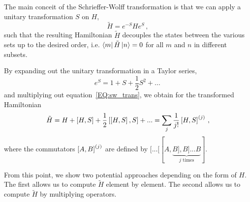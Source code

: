 The main conceit of the Schrieffer-Wolff transformation is that we can apply a unitary transformation $S$ on $H$,
\begin{equation}\label{EQ:sw_trans}
    \tilde{H} =e^{-S}He^S \,,
\end{equation}
such that the resulting Hamiltonian $\tilde{H}$ decouples the states between the various sets up to the desired order, i.e. $\bra{m}\tilde{H}\ket{n} = 0$ for all $m$ and $n$ in different subsets.

By expanding out the unitary transformation in a Taylor series,
\begin{equation}
    e^{S} = 1 + S + \frac{1}{2}S^2 + ...\,
\end{equation}
and multiplying out equation~\ref{EQ:sw_trans}, we obtain for the transformed Hamiltonian
\begin{equation}\label{EQ:sw_trans_expanded}
    \tilde{H} = H + \left[H,S\right] + \frac{1}{2}\left[\left[H,S\right],S\right] + ... = \sum_j \frac{1}{j!}\left[H,S\right]^{(j)} \,,
\end{equation}
where the commutators $\left[A,B\right]^{(j)}$ are defined by $[...[[A,\underbrace{B],B]...B}_{j\textrm{ times}}]$.

From this point, we show two potential approaches depending on the form of $H$. The first allows us to compute $\tilde{H}$ element by element. The second allows us to compute $\tilde{H}$ by multiplying operators.